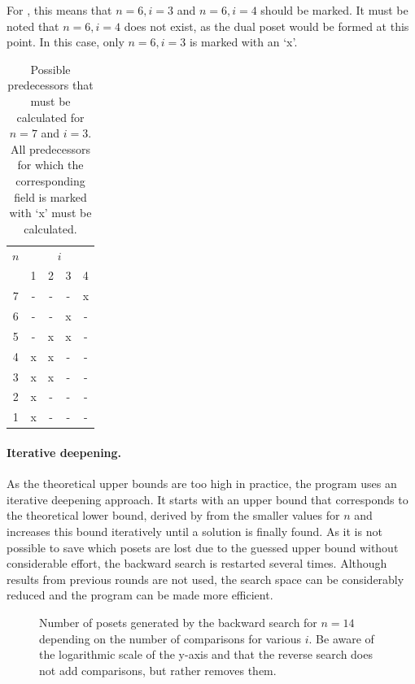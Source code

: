 \documentclass[twoside,leqno,twocolumn]{article}
\begin{document}
For , this means that $n = 6, i = 3$ and $n = 6, i = 4$ should be marked.
It must be noted that $n = 6, i = 4$ does not exist, as the dual poset would be formed at this point.
In this case, only $n = 6, i = 3$ is marked with an `x'.

\begin{table}[!t]
  \renewcommand{\arraystretch}{1.2}
  \caption{Possible predecessors that must be calculated for $n = 7$ and $i = 3$. All predecessors for which the corresponding field is marked with `x' must be calculated.}
  \label{table:n_i_values_calculated}
  \centering
  \begin{tabular}{c|cccc}
    $n$ & \multicolumn{4}{c}{$i$}             \\
        & 1                       & 2 & 3 & 4 \\ \hline
    7   & -                       & - & - & x \\
    6   & -                       & - & x & - \\
    5   & -                       & x & x & - \\
    4   & x                       & x & - & - \\
    3   & x                       & x & - & - \\
    2   & x                       & - & - & - \\
    1   & x                       & - & - & - \\
  \end{tabular}%
\end{table}

\paragraph{Iterative deepening.}
As the theoretical upper bounds are too high in practice, the program uses an iterative deepening approach.
It starts with an upper bound that corresponds to the theoretical lower bound, derived by  from the smaller values for $n$ and increases this bound iteratively until a solution is finally found.
As it is not possible to save which posets are lost due to the guessed upper bound without considerable effort, the backward search is restarted several times.
Although results from previous rounds are not used, the search space can be considerably reduced and the program can be made more efficient.

\begin{figure}[!b]
  \centering
  
  \caption{Number of posets generated by the backward search for $n = 14$ depending on the number of comparisons for various $i$. Be aware of the logarithmic scale of the y-axis and that the reverse search does not add comparisons, but rather removes them.}
  \label{fig:backward-posets-per-level}
\end{figure}
\end{document}
